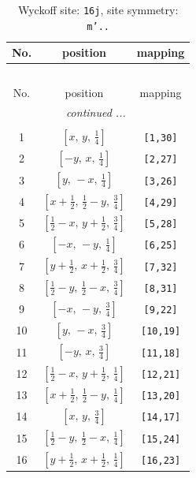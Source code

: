 \documentclass[fleqn,8pt]{jsarticle}
\begin{document}
\renewcommand{\arraystretch}{1.2}
\begin{longtable}{ccc}
\caption{Wyckoff site: {\tt 16j}, site symmetry: {\tt m'..}}
 \\
 \hline \hline
No. & position & mapping \\ \hline \endfirsthead

\multicolumn{2}{l}{\tablename\ \thetable{}} \\
 \hline \hline
No. & position & mapping \\ \hline \endhead

 \hline \hline
\multicolumn{2}{r}{\footnotesize\it continued ...} \\ \endfoot

 \hline \hline
\multicolumn{2}{r}{} \\ \endlastfoot

1 & $\left[ x,\, y,\, \frac{1}{4} \right]$ & {\tt [1,30]} \\ \hline
2 & $\left[ - y,\, x,\, \frac{1}{4} \right]$ & {\tt [2,27]} \\ \hline
3 & $\left[ y,\, - x,\, \frac{1}{4} \right]$ & {\tt [3,26]} \\ \hline
4 & $\left[ x + \frac{1}{2},\, \frac{1}{2} - y,\, \frac{3}{4} \right]$ & {\tt [4,29]} \\ \hline
5 & $\left[ \frac{1}{2} - x,\, y + \frac{1}{2},\, \frac{3}{4} \right]$ & {\tt [5,28]} \\ \hline
6 & $\left[ - x,\, - y,\, \frac{1}{4} \right]$ & {\tt [6,25]} \\ \hline
7 & $\left[ y + \frac{1}{2},\, x + \frac{1}{2},\, \frac{3}{4} \right]$ & {\tt [7,32]} \\ \hline
8 & $\left[ \frac{1}{2} - y,\, \frac{1}{2} - x,\, \frac{3}{4} \right]$ & {\tt [8,31]} \\ \hline
9 & $\left[ - x,\, - y,\, \frac{3}{4} \right]$ & {\tt [9,22]} \\ \hline
10 & $\left[ y,\, - x,\, \frac{3}{4} \right]$ & {\tt [10,19]} \\ \hline
11 & $\left[ - y,\, x,\, \frac{3}{4} \right]$ & {\tt [11,18]} \\ \hline
12 & $\left[ \frac{1}{2} - x,\, y + \frac{1}{2},\, \frac{1}{4} \right]$ & {\tt [12,21]} \\ \hline
13 & $\left[ x + \frac{1}{2},\, \frac{1}{2} - y,\, \frac{1}{4} \right]$ & {\tt [13,20]} \\ \hline
14 & $\left[ x,\, y,\, \frac{3}{4} \right]$ & {\tt [14,17]} \\ \hline
15 & $\left[ \frac{1}{2} - y,\, \frac{1}{2} - x,\, \frac{1}{4} \right]$ & {\tt [15,24]} \\ \hline
16 & $\left[ y + \frac{1}{2},\, x + \frac{1}{2},\, \frac{1}{4} \right]$ & {\tt [16,23]} \\
\end{longtable}
\end{document}
